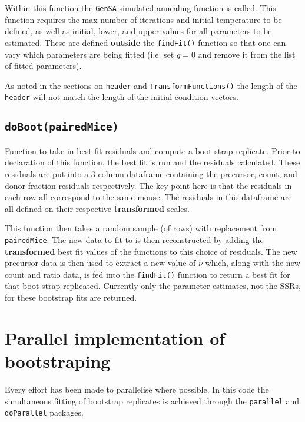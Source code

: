 \documentclass{tufte-book} %
\begin{document}
Within this function the \texttt{GenSA} simulated annealing function is called. This function requires the max number of iterations and initial temperature to be defined, as well as initial, lower, and upper values for all parameters to be estimated. These are defined \textbf{outside} the \texttt{findFit()} function so that one can vary which parameters are being fitted (i.e. set $q=0$ and remove it from the list of fitted parameters). 

As noted in the sections on \texttt{header} and \texttt{TransformFunctions()} the length of the \texttt{header} will not match the length of the initial condition vectors. 
\subsection{\texttt{doBoot(pairedMice)}}
Function to take in best fit residuals and compute a boot strap replicate. Prior to declaration of this function, the best fit is run and the residuals calculated. These residuals are put into a 3-column dataframe containing the precursor, count, and donor fraction residuals respectively. The key point here is that the residuals in each row all correspond to the same mouse. The residuals in this dataframe are all defined on their respective \textbf{transformed} scales.

This function then takes a random sample (of rows) with replacement from \texttt{pairedMice}. The new data to fit to is then reconstructed by adding the \textbf{transformed} best fit values of the functions to this choice of residuals. The new precursor data is then used to extract a new value of $\nu$ which, along with the new count and ratio data, is fed into the \texttt{findFit()} function to return a best fit for that boot strap replicated. Currently only the parameter estimates, not the SSRs, for these bootstrap fits are returned. 

\section{Parallel implementation of bootstraping}
 Every effort has been made to parallelise where possible. In this code the simultaneous fitting of bootstrap replicates is achieved through the \texttt{parallel} and \texttt{doParallel} packages. 
\end{document}
